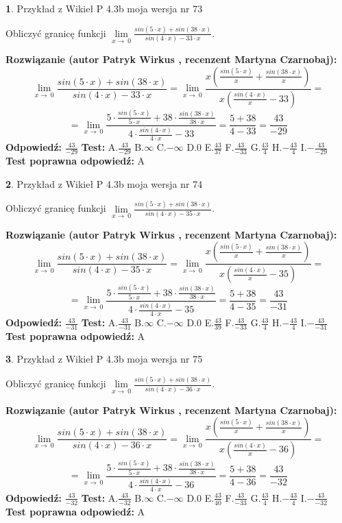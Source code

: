 \documentclass[12pt, a4paper]{article}
\theoremstyle{definition} %
\newtheorem{zad}{}
\newcommand{\zadStart}[1]{\begin{zad}#1\newline}
\newcommand{\zadStop}{\end{zad}}
\newcommand{\rozwStart}[2]{\noindent \textbf{Rozwiązanie (autor #1 , recenzent #2): }\newline}
\newcommand{\rozwStop}{\newline}
\newcommand{\odpStart}{\noindent \textbf{Odpowiedź:}\newline}
\newcommand{\odpStop}{\newline}
\newcommand{\testStart}{\noindent \textbf{Test:}\newline}
\newcommand{\testStop}{\newline}
\newcommand{\kluczStart}{\noindent \textbf{Test poprawna odpowiedź:}\newline}
\newcommand{\kluczStop}{\newline}
\begin{document}
\zadStart{Przykład z Wikieł P 4.3b moja wersja nr 73}


Obliczyć granicę funkcji $\lim\limits_{x\to\ 0}\frac{sin(5 \cdot x)+sin(38 \cdot x)}{sin(4 \cdot x)-33 \cdot x}$.
\zadStop
\rozwStart{Patryk Wirkus}{Martyna Czarnobaj}
$$\lim\limits_{x\to\ 0}\frac{sin(5 \cdot x)+sin(38 \cdot x)}{sin(4 \cdot x)-33 \cdot x}=\lim\limits_{x\to\ 0}\frac{x(\frac{sin(5 \cdot x)}{x}+\frac{sin(38 \cdot x)}{x})}{x(\frac{sin(4 \cdot x)}{x}-33)}=$$
$$=\lim\limits_{x\to\ 0}\frac{5 \cdot \frac{sin(5 \cdot x)}{5 \cdot x}+38 \cdot \frac{sin(38 \cdot x)}{38 \cdot x}}{4 \cdot \frac{sin(4 \cdot x)}{4 \cdot x}-33}=\frac{5+38}{4-33} = \frac{43}{-29}$$
\rozwStop
\odpStart
$\frac{43}{-29}$
\odpStop
\testStart
A.$\frac{43}{-29}$
B.$\infty$
C.$-\infty$
D.$0$
E.$\frac{43}{37}$
F.$\frac{43}{-33}$
G.$\frac{43}{4}$
H.$-\frac{43}{4}$
I.$-\frac{43}{-29}$
\testStop
\kluczStart
A
\kluczStop



\zadStart{Przykład z Wikieł P 4.3b moja wersja nr 74}


Obliczyć granicę funkcji $\lim\limits_{x\to\ 0}\frac{sin(5 \cdot x)+sin(38 \cdot x)}{sin(4 \cdot x)-35 \cdot x}$.
\zadStop
\rozwStart{Patryk Wirkus}{Martyna Czarnobaj}
$$\lim\limits_{x\to\ 0}\frac{sin(5 \cdot x)+sin(38 \cdot x)}{sin(4 \cdot x)-35 \cdot x}=\lim\limits_{x\to\ 0}\frac{x(\frac{sin(5 \cdot x)}{x}+\frac{sin(38 \cdot x)}{x})}{x(\frac{sin(4 \cdot x)}{x}-35)}=$$
$$=\lim\limits_{x\to\ 0}\frac{5 \cdot \frac{sin(5 \cdot x)}{5 \cdot x}+38 \cdot \frac{sin(38 \cdot x)}{38 \cdot x}}{4 \cdot \frac{sin(4 \cdot x)}{4 \cdot x}-35}=\frac{5+38}{4-35} = \frac{43}{-31}$$
\rozwStop
\odpStart
$\frac{43}{-31}$
\odpStop
\testStart
A.$\frac{43}{-31}$
B.$\infty$
C.$-\infty$
D.$0$
E.$\frac{43}{39}$
F.$\frac{43}{-33}$
G.$\frac{43}{4}$
H.$-\frac{43}{4}$
I.$-\frac{43}{-31}$
\testStop
\kluczStart
A
\kluczStop



\zadStart{Przykład z Wikieł P 4.3b moja wersja nr 75}


Obliczyć granicę funkcji $\lim\limits_{x\to\ 0}\frac{sin(5 \cdot x)+sin(38 \cdot x)}{sin(4 \cdot x)-36 \cdot x}$.
\zadStop
\rozwStart{Patryk Wirkus}{Martyna Czarnobaj}
$$\lim\limits_{x\to\ 0}\frac{sin(5 \cdot x)+sin(38 \cdot x)}{sin(4 \cdot x)-36 \cdot x}=\lim\limits_{x\to\ 0}\frac{x(\frac{sin(5 \cdot x)}{x}+\frac{sin(38 \cdot x)}{x})}{x(\frac{sin(4 \cdot x)}{x}-36)}=$$
$$=\lim\limits_{x\to\ 0}\frac{5 \cdot \frac{sin(5 \cdot x)}{5 \cdot x}+38 \cdot \frac{sin(38 \cdot x)}{38 \cdot x}}{4 \cdot \frac{sin(4 \cdot x)}{4 \cdot x}-36}=\frac{5+38}{4-36} = \frac{43}{-32}$$
\rozwStop
\odpStart
$\frac{43}{-32}$
\odpStop
\testStart
A.$\frac{43}{-32}$
B.$\infty$
C.$-\infty$
D.$0$
E.$\frac{43}{40}$
F.$\frac{43}{-33}$
G.$\frac{43}{4}$
H.$-\frac{43}{4}$
I.$-\frac{43}{-32}$
\testStop
\kluczStart
A
\kluczStop
\end{document}
